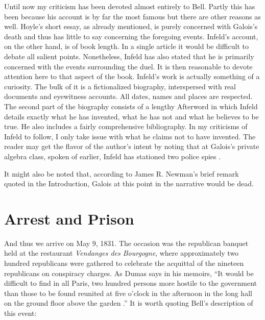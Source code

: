 \documentclass[12pt]{article}
\begin{document}
Until now my criticism has been devoted almost entirely to Bell. Partly this has been because his account is by far the most famous but there are other reasons as well. Hoyle's short essay, as already mentioned, is purely concerned with Galois's death and thus has little to say concerning the foregoing events. Infeld's account, on the other hand, is of book length. In a single article it would be difficult to debate all salient points. Nonetheless, Infeld has also stated \cite{46} that he is primarily concerned with the events surrounding the duel. It is then reasonable to devote attention here to that aspect of the book. Infeld's work is actually something of a curiosity. The bulk of it is a fictionalized biography, interspersed with real documents and eyewitness accounts. All dates, names and places are respected. The second part of the biography consists of a lengthy Afterword in which Infeld details exactly what he has invented, what he has not and what he believes to be true. He also includes a fairly comprehensive bibliography. In my criticisms of Infeld to follow, I only take issue with what he claims not to have invented. The reader may get the flavor of the author's intent by noting that at Galois's private algebra class, spoken of earlier, Infeld has stationed two police spies \cite{47}.

It might also be noted that, according to James R. Newman's brief remark quoted in the Introduction, Galois at this point in the narrative would be dead.

\section{Arrest and Prison}

And thus we arrive on May 9, 1831. The occasion was the republican banquet held at the restaurant \emph{Vendanges des Bourgogne}, where approximately two hundred republicans were gathered to celebrate the acquittal of the nineteen republicans on conspiracy charges. As Dumas says in his memoirs, ``It would be difficult to find in all Paris, two hundred persons more hostile to the government than those to be found reunited at five o'clock in the afternoon in the long hall on the ground floor above the garden \cite{48}.'' It is worth quoting Bell's description of this event:
\end{document}
